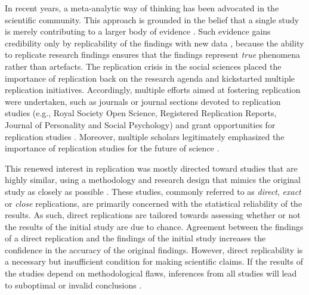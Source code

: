 \documentclass[
]{article}
\begin{document}
In recent years, a meta-analytic way of thinking has been advocated in
the scientific community. This approach is grounded in the belief that a
single study is merely contributing to a larger body of evidence
\citep[e.g.,][]{asendorpf_recommendations_2016, cumming_new_2014, goodman_reproducibility_2016}.
Such evidence gains credibility only by replicability of the findings
with new data \citep{schmidt_replication_2009}, because the ability to
replicate research findings ensures that the findings represent
\emph{true} phenomena rather than artefacts. The replication crisis in
the social sciences placed the importance of replication back on the
research agenda and kickstarted multiple replication initiatives.
Accordingly, multiple efforts aimed at fostering replication were
undertaken, such as journals or journal sections devoted to replication
studies (e.g., Royal Society Open Science, Registered Replication
Reports, Journal of Personality and Social Psychology) and grant
opportunities for replication studies
\citep[e.g.,][]{nwo_replication_2020}. Moreover, multiple scholars
legitimately emphasized the importance of replication studies for the
future of science
\citep[e.g.,][]{baker_reproducibility_2016, brandt_et_al_replication_2014, munafo_manifesto_2017}.

This renewed interest in replication was mostly directed toward studies
that are highly similar, using a methodology and research design that
mimics the original study as closely as possible
\citep[e.g.,][]{camerer2016evaluating, camerer2018evaluating, klein_etal_replicability_2014, nosek_replicability_review_2021, open_science_collab_2015}.
These studies, commonly referred to as \emph{direct}, \emph{exact} or
\emph{close} replications, are primarily concerned with the statistical
reliability of the results. As such, direct replications are tailored
towards assessing whether or not the results of the initial study are
due to chance. Agreement between the findings of a direct replication
and the findings of the initial study increases the confidence in the
accuracy of the original findings. However, direct replicability is a
necessary but insufficient condition for making scientific claims. If
the results of the studies depend on methodological flaws, inferences
from all studies will lead to suboptimal or invalid conclusions
\citep{lawlor_triangulation_2017, munafo_robust_2018}.
\end{document}
